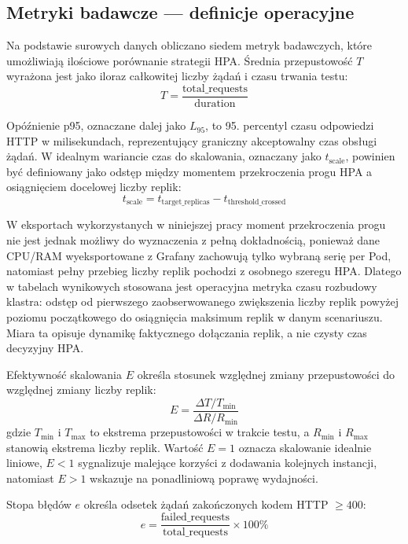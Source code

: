 \subsection{Metryki badawcze — definicje operacyjne}

Na podstawie surowych danych obliczano siedem metryk badawczych, które umożliwiają ilościowe porównanie strategii HPA. Średnia przepustowość $T$ wyrażona jest jako iloraz całkowitej liczby żądań i czasu trwania testu:
\begin{equation}
  T = \frac{\text{total\_requests}}{\text{duration}}
\end{equation}

Opóźnienie p95, oznaczane dalej jako $L_{95}$, to 95. percentyl czasu odpowiedzi HTTP w milisekundach, reprezentujący graniczny akceptowalny czas obsługi żądań. W idealnym wariancie czas do skalowania, oznaczany jako $t_{\text{scale}}$, powinien być definiowany jako odstęp między momentem przekroczenia progu HPA a osiągnięciem docelowej liczby replik:
\begin{equation}
  t_{\text{scale}} = t_{\text{target\_replicas}} - t_{\text{threshold\_crossed}}
\end{equation}

W eksportach wykorzystanych w niniejszej pracy moment przekroczenia progu nie jest jednak możliwy do wyznaczenia z pełną dokładnością, ponieważ dane CPU/RAM wyeksportowane z Grafany zachowują tylko wybraną serię per Pod, natomiast pełny przebieg liczby replik pochodzi z osobnego szeregu HPA. Dlatego w tabelach wynikowych stosowana jest operacyjna metryka czasu rozbudowy klastra: odstęp od pierwszego zaobserwowanego zwiększenia liczby replik powyżej poziomu początkowego do osiągnięcia maksimum replik w danym scenariuszu. Miara ta opisuje dynamikę faktycznego dołączania replik, a nie czysty czas decyzyjny HPA.

Efektywność skalowania $E$ określa stosunek względnej zmiany przepustowości do względnej zmiany liczby replik:
\begin{equation}
  E = \frac{\Delta T / T_{\text{min}}}{\Delta R / R_{\text{min}}}
\end{equation}
gdzie $T_{\text{min}}$ i $T_{\text{max}}$ to ekstrema przepustowości w trakcie testu, a $R_{\text{min}}$ i $R_{\text{max}}$ stanowią ekstrema liczby replik. Wartość $E = 1$ oznacza skalowanie idealnie liniowe, $E < 1$ sygnalizuje malejące korzyści z dodawania kolejnych instancji, natomiast $E > 1$ wskazuje na ponadliniową poprawę wydajności.

Stopa błędów $e$ określa odsetek żądań zakończonych kodem HTTP $\geq 400$:
\begin{equation}
  e = \frac{\text{failed\_requests}}{\text{total\_requests}} \times 100\%
\end{equation}


